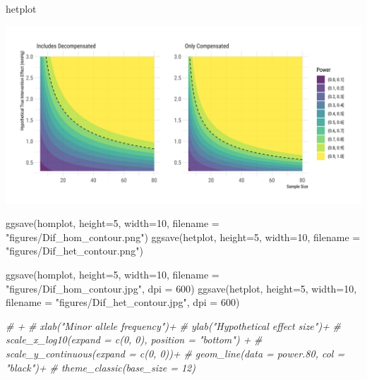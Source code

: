 \documentclass[
]{article}
\newenvironment{Shaded}{\begin{snugshade}}{\end{snugshade}}
\newcommand{\AttributeTok}[1]{\textcolor[rgb]{0.77,0.63,0.00}{#1}}
\newcommand{\CommentTok}[1]{\textcolor[rgb]{0.56,0.35,0.01}{\textit{#1}}}
\newcommand{\DecValTok}[1]{\textcolor[rgb]{0.00,0.00,0.81}{#1}}
\newcommand{\FunctionTok}[1]{\textcolor[rgb]{0.00,0.00,0.00}{#1}}
\newcommand{\NormalTok}[1]{#1}
\newcommand{\StringTok}[1]{\textcolor[rgb]{0.31,0.60,0.02}{#1}}
\begin{document}
\begin{Shaded}
\begin{Highlighting}[]
\NormalTok{hetplot}
\end{Highlighting}
\end{Shaded}

\includegraphics{figures/unnamed-chunk-66-2.png}

\begin{Shaded}
\begin{Highlighting}[]
\FunctionTok{ggsave}\NormalTok{(homplot, }\AttributeTok{height=}\DecValTok{5}\NormalTok{, }\AttributeTok{width=}\DecValTok{10}\NormalTok{, }\AttributeTok{filename =} \StringTok{"figures/Dif\_hom\_contour.png"}\NormalTok{)}
\FunctionTok{ggsave}\NormalTok{(hetplot, }\AttributeTok{height=}\DecValTok{5}\NormalTok{, }\AttributeTok{width=}\DecValTok{10}\NormalTok{, }\AttributeTok{filename =} \StringTok{"figures/Dif\_het\_contour.png"}\NormalTok{)}

\FunctionTok{ggsave}\NormalTok{(homplot, }\AttributeTok{height=}\DecValTok{5}\NormalTok{, }\AttributeTok{width=}\DecValTok{10}\NormalTok{, }\AttributeTok{filename =} \StringTok{"figures/Dif\_hom\_contour.jpg"}\NormalTok{, }
       \AttributeTok{dpi =} \DecValTok{600}\NormalTok{)}
\FunctionTok{ggsave}\NormalTok{(hetplot, }\AttributeTok{height=}\DecValTok{5}\NormalTok{, }\AttributeTok{width=}\DecValTok{10}\NormalTok{, }\AttributeTok{filename =} \StringTok{"figures/Dif\_het\_contour.jpg"}\NormalTok{, }
       \AttributeTok{dpi =} \DecValTok{600}\NormalTok{)}

\CommentTok{\# +}
\CommentTok{\#   xlab("Minor allele frequency")+}
\CommentTok{\#   ylab("Hypothetical effect size")+}
\CommentTok{\#   scale\_x\_log10(expand = c(0, 0), position = "bottom") +}
\CommentTok{\#   scale\_y\_continuous(expand = c(0, 0))+}
\CommentTok{\#   geom\_line(data = power.80, col = "black")+}
\CommentTok{\#   theme\_classic(base\_size = 12)}
\end{Highlighting}
\end{Shaded}
\end{document}
